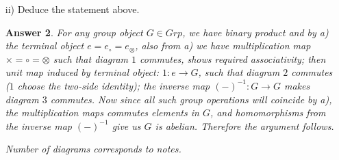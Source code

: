\documentclass[11pt,leqno]{article}
\newcommand{\<}[1]{{\langle}#1 {\rangle}}
\theoremstyle{plain}
\newtheorem*{answer*}{Answer}
\theoremstyle{definition}
\theoremstyle{remark}
\numberwithin{equation}{section}
\begin{document}
\begin{enumerate}
\begin{itemize}
\begin{answer*}
    Take $b=c=e_\otimes$, then $(a\otimes e_\otimes) \circ (e_\otimes \otimes d) = (a\circ e_\circ) \otimes (e_\circ \circ d)$, thus $a \circ d= a \otimes d $ for any $a,d \in A$. We conclude $\otimes$ defines the same function as $\circ$.
    
    Commutativity follows naturally by notice $bc=cb$ for any $b,c \in A$. Associativity follows by taking $b=e$ and notice $a(cd)=(ac)d$. 
    \end{answer*}
\item[ii)] Deduce the statement above.
    \begin{answer*}
    For any group object $G \in Grp$, we have binary product and by a) the terminal object ${e=e_\circ = e_\otimes}$, also from a) we have multiplication map $\times = \circ =\otimes$ such that diagram $1$ commutes, shows required associativity; then unit map induced by terminal object: $1: {e}\rightarrow G$, such that diagram $2$ commutes ($1$ choose the two-side identity); the inverse map $(-)^{-1}:G\rightarrow G$ makes diagram $3$ commutes. Now since all such group operations will coincide by a), the multiplication maps  commutes elements in $G$, and homomorphisms from the inverse map $(-)^{-1}$ give us $G$ is abelian.
    Therefore the argument follows. 
    
    Number of diagrams corresponds to notes. 
    \end{answer*}
\end{itemize}



\end{enumerate}
\end{document}
